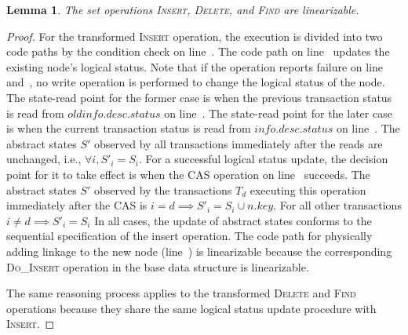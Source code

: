 \documentclass[]{sig-alternate-05-2015}
\newtheorem{lemma}{Lemma}
\begin{document}
\begin{lemma}
    \label{lemma:linearizable}
    The set operations \textsc{Insert}, \textsc{Delete}, and \textsc{Find} are linearizable.
\end{lemma}
\begin{proof}
    For the transformed \textsc{Insert} operation, the execution is divided into two code paths by the condition check on line~.
    The code path on line~ updates the existing node's logical status.
    Note that if the operation reports failure on line~ and~, no write operation is performed to change the logical status of the node.
    The state-read point for the former case is when the previous transaction status is read from $oldinfo.desc.status$ on line~.
    The state-read point for the later case is when the current transaction status is read from $info.desc.status$ on line~.
    The abstract states $S'$ observed by all transactions immediately after the reads are unchanged, i.e., $\forall i, S'_i = S_i $.
    For a successful logical status update, the decision point for it to take effect is when the CAS operation on line~ succeeds.
    The abstract states $S'$ observed by the transactions $T_d$ executing this operation immediately after the CAS is $i=d \implies S'_i = S_i \cup n.key$.
    For all other transactions $i \ne d \implies S'_i = S_i$
    In all cases, the update of abstract states conforms to the sequential specification of the insert operation.
    The code path for physically adding linkage to the new node (line~) is linearizable because the corresponding \textsc{Do\_Insert} operation in the base data structure is linearizable.
    
    The same reasoning process applies to the transformed \textsc{Delete} and \textsc{Find} operations because they share the same logical status update procedure with \textsc{Insert}.
\end{proof}
\end{document}
